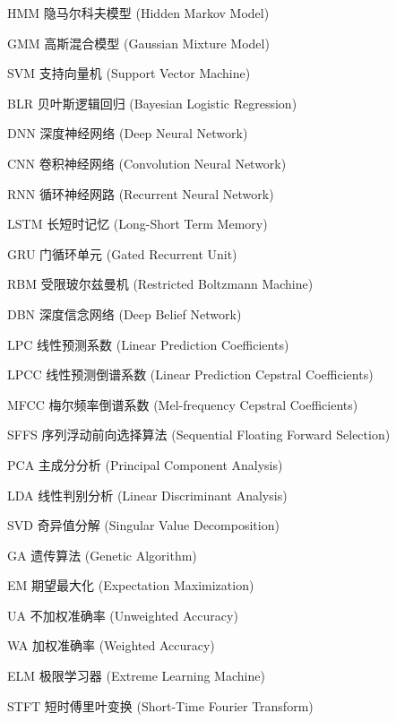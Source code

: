 \begin{denotation}[3cm]
\item [HMM] 隐马尔科夫模型 (Hidden Markov Model)
\item [GMM] 高斯混合模型 (Gaussian Mixture Model)
\item [SVM] 支持向量机 (Support Vector Machine)
\item [BLR] 贝叶斯逻辑回归 (Bayesian Logistic Regression)
\item [DNN] 深度神经网络 (Deep Neural Network)
\item [CNN] 卷积神经网络 (Convolution Neural Network)
\item [RNN] 循环神经网路 (Recurrent Neural Network)
\item [LSTM] 长短时记忆 (Long-Short Term Memory)
\item [GRU] 门循环单元 (Gated Recurrent Unit)
\item [RBM] 受限玻尔兹曼机 (Restricted Boltzmann Machine)
\item [DBN] 深度信念网络 (Deep Belief Network)
\item [LPC] 线性预测系数 (Linear Prediction Coefficients)
\item [LPCC] 线性预测倒谱系数 (Linear Prediction Cepstral Coefficients)
\item [MFCC] 梅尔频率倒谱系数 (Mel-frequency Cepstral Coefficients)
\item [SFFS] 序列浮动前向选择算法 (Sequential Floating Forward Selection)
\item [PCA] 主成分分析 (Principal Component Analysis)
\item [LDA] 线性判别分析 (Linear Discriminant Analysis)
\item [SVD] 奇异值分解 (Singular Value Decomposition)
\item [GA] 遗传算法 (Genetic Algorithm)
\item [EM] 期望最大化 (Expectation Maximization)
\item [UA] 不加权准确率 (Unweighted Accuracy)
\item [WA] 加权准确率 (Weighted Accuracy)
\item [ELM] 极限学习器 (Extreme Learning Machine)
\item [STFT] 短时傅里叶变换 (Short-Time Fourier Transform)
\end{denotation}
